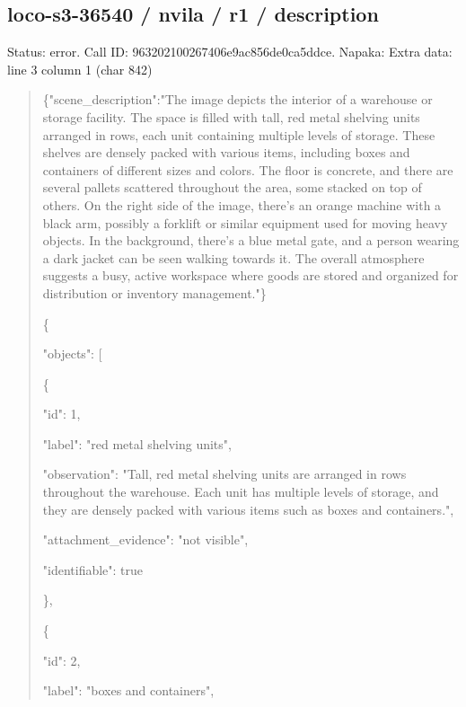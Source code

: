 \documentclass[10pt,a4paper]{article}
\begin{document}
\subsection*{loco-s3-36540 / nvila / r1 / description}
Status: error. Call ID: 963202100267406e9ac856de0ca5ddce. Napaka: Extra data: line 3 column 1 (char 842)
\begin{quote}\footnotesize
\{"scene\_description":\allowbreak{}"The image depicts the interior of a warehouse or storage facility. The space is filled with tall,\allowbreak{} red metal shelving units arranged in rows,\allowbreak{} each unit containing multiple levels of storage. These shelves are densely packed with various items,\allowbreak{} including boxes and containers of different sizes and colors. The floor is concrete,\allowbreak{} and there are several pallets scattered throughout the area,\allowbreak{} some stacked on top of others. On the right side of the image,\allowbreak{} there's an orange machine with a black arm,\allowbreak{} possibly a forklift or similar equipment used for moving heavy objects. In the background,\allowbreak{} there's a blue metal gate,\allowbreak{} and a person wearing a dark jacket can be seen walking towards it. The overall atmosphere suggests a busy,\allowbreak{} active workspace where goods are stored and organized for distribution or inventory management."\}\par
\par
\{\par
  "objects":\allowbreak{} [\par
    \{\par
      "id":\allowbreak{} 1,\allowbreak{}\par
      "label":\allowbreak{} "red metal shelving units",\allowbreak{}\par
      "observation":\allowbreak{} "Tall,\allowbreak{} red metal shelving units are arranged in rows throughout the warehouse. Each unit has multiple levels of storage,\allowbreak{} and they are densely packed with various items such as boxes and containers.",\allowbreak{}\par
      "attachment\_evidence":\allowbreak{} "not visible",\allowbreak{}\par
      "identifiable":\allowbreak{} true\par
    \},\allowbreak{}\par
    \{\par
      "id":\allowbreak{} 2,\allowbreak{}\par
      "label":\allowbreak{} "boxes and containers",\allowbreak{}\par

\end{quote}
\end{document}
